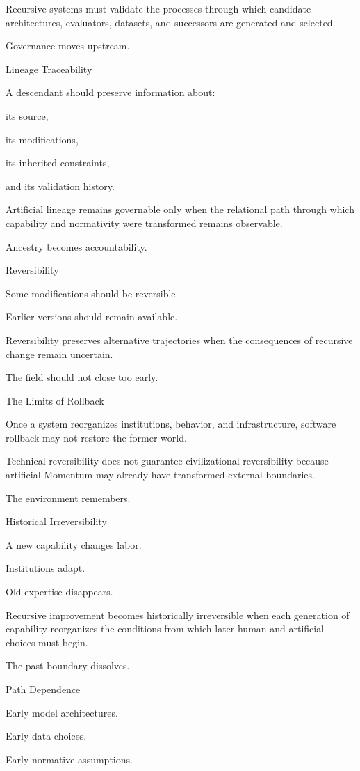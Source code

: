 Recursive systems must validate the processes through which candidate architectures, evaluators, datasets, and successors are generated and selected.

Governance moves upstream.

Lineage Traceability

A descendant should preserve information about:

its source,

its modifications,

its inherited constraints,

and its validation history.

Artificial lineage remains governable only when the relational path through which capability and normativity were transformed remains observable.

Ancestry becomes accountability.

Reversibility

Some modifications should be reversible.

Earlier versions should remain available.

Reversibility preserves alternative trajectories when the consequences of recursive change remain uncertain.

The field should not close too early.

The Limits of Rollback

Once a system reorganizes institutions, behavior, and infrastructure, software rollback may not restore the former world.

Technical reversibility does not guarantee civilizational reversibility because artificial Momentum may already have transformed external boundaries.

The environment remembers.

Historical Irreversibility

A new capability changes labor.

Institutions adapt.

Old expertise disappears.

Recursive improvement becomes historically irreversible when each generation of capability reorganizes the conditions from which later human and artificial choices must begin.

The past boundary dissolves.

Path Dependence

Early model architectures.

Early data choices.

Early normative assumptions.

